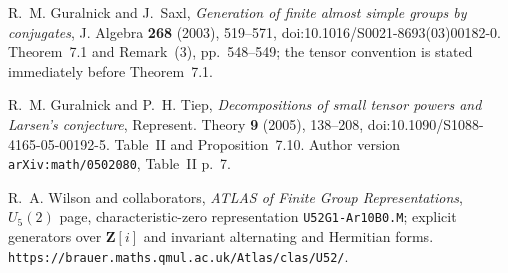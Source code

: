  R.~M. Guralnick and J.~Saxl,
\emph{Generation of finite almost simple groups by conjugates},
J. Algebra \textbf{268} (2003), 519--571,
doi:10.1016/S0021-8693(03)00182-0.
Theorem~7.1 and Remark~(3), pp.~548--549; the tensor convention is
stated immediately before Theorem~7.1.

 R.~M. Guralnick and P.~H. Tiep,
\emph{Decompositions of small tensor powers and Larsen's conjecture},
Represent. Theory \textbf{9} (2005), 138--208,
doi:10.1090/S1088-4165-05-00192-5.
Table~II and Proposition~7.10.  Author version
\texttt{arXiv:math/0502080}, Table~II p.~7.

 R.~A. Wilson and collaborators,
\emph{ATLAS of Finite Group Representations},
$U_5(2)$ page, characteristic-zero representation
\texttt{U52G1-Ar10B0.M}; explicit generators over $\mathbf Z[i]$
and invariant alternating and Hermitian forms.
\texttt{https://brauer.maths.qmul.ac.uk/Atlas/clas/U52/}.
